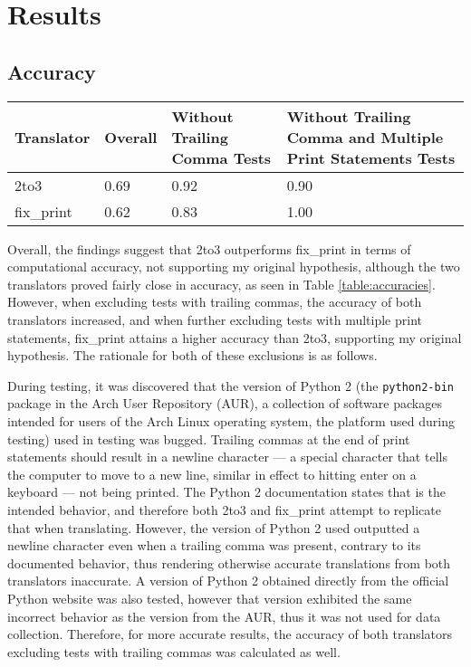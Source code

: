 \section{Results}

\subsection{Accuracy}
\begin{table*}[hbt!]
    \centering
    \begin{tabular}{@{}l|lll@{}}
    \toprule
    Translator & Overall & Without Trailing Comma Tests & Without Trailing Comma and Multiple Print Statements Tests \\ \midrule
    2to3       & 0.69                         & 0.92                                      & 0.90                                                                             \\
    fix\_print & 0.62                          & 0.83                                      & 1.00                                                                               \\ \bottomrule
    \end{tabular}
    \caption{Computational accuracy of 2to3 and fix\_print.}
    \label{table:accuracies}
\end{table*}

Overall, the findings suggest that 2to3 outperforms fix\_print in terms of computational accuracy, not supporting my original hypothesis, although the two translators proved fairly close in accuracy, as seen in Table \ref{table:accuracies}. However, when excluding tests with trailing commas, the accuracy of both translators increased, and when further excluding tests with multiple print statements, fix\_print attains a higher accuracy than 2to3, supporting my original hypothesis. The rationale for both of these exclusions is as follows.

During testing, it was discovered that the version of Python 2 (the \verb|python2-bin| package in the Arch User Repository (AUR), a collection of software packages intended for users of the Arch Linux operating system, the platform used during testing) used in testing was bugged. Trailing commas at the end of print statements should result in a newline character --- a special character that tells the computer to move to a new line, similar in effect to hitting enter on a keyboard --- not being printed. The Python 2 documentation states that is the intended behavior, and therefore both 2to3 and fix\_print attempt to replicate that when translating. However, the version of Python 2 used outputted a newline character even when a trailing comma was present, contrary to its documented behavior, thus rendering otherwise accurate translations from both translators inaccurate. A version of Python 2 obtained directly from the official Python website was also tested, however that version exhibited the same incorrect behavior as the version from the AUR, thus it was not used for data collection. Therefore, for more accurate results, the accuracy of both translators excluding tests with trailing commas was calculated as well.

